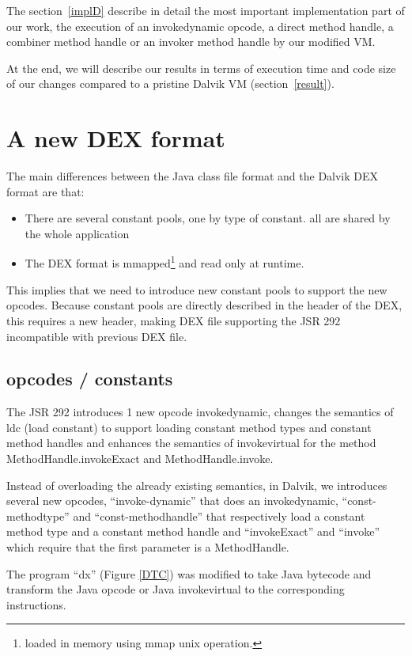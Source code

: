 \documentclass{sig-alternate}
\def \Jsr{JSR\xspace}
\def \JSR{\Jsr 292\xspace}
\begin{document}
  The section~\ref{implD} describe in detail the most important implementation part of our work,
  the execution of an invokedynamic opcode, a direct method handle, a combiner method handle or
  an invoker method handle by our modified VM.
  
  At the end, we will describe our results in terms of execution time and code size of our changes
  compared to a pristine Dalvik VM (section~\ref{result}).\\

\section{A new DEX format}
\label{newDEX}

  The main differences between the Java class file format and the Dalvik DEX format
  are that:
  \begin{itemize}
   \item There are several constant pools, one by type of constant.
         all are shared by the whole application
   \item The DEX format is mmapped\footnote{loaded in memory using mmap unix operation.}
    and read only at runtime.
  \end{itemize}
  
  This implies that we need to introduce new constant pools to support the new opcodes.
  Because constant pools are directly described in the header of the DEX,
  this requires a new header, making DEX file supporting the JSR 292 incompatible
  with previous DEX file.
  
  \subsection{opcodes / constants}
    The \JSR introduces 1 new opcode invokedynamic, changes the semantics of ldc (load constant)
    to support loading constant method types and constant method handles and enhances the semantics
    of invokevirtual for the method MethodHandle.invokeExact and MethodHandle.invoke.

    Instead of overloading the already existing semantics, in Dalvik, we introduces several new opcodes,
    ``invoke-dynamic'' that does an invokedynamic,
    ``const-methodtype'' and ``const-methodhandle'' that respectively load a constant method type
    and a constant method handle and ``invokeExact'' and ``invoke'' which require that the first parameter
    is a MethodHandle.

    The program ``dx'' (Figure \ref{DTC}) was modified to take Java bytecode and 
    transform the Java opcode or Java invokevirtual to the corresponding instructions.
\end{document}
